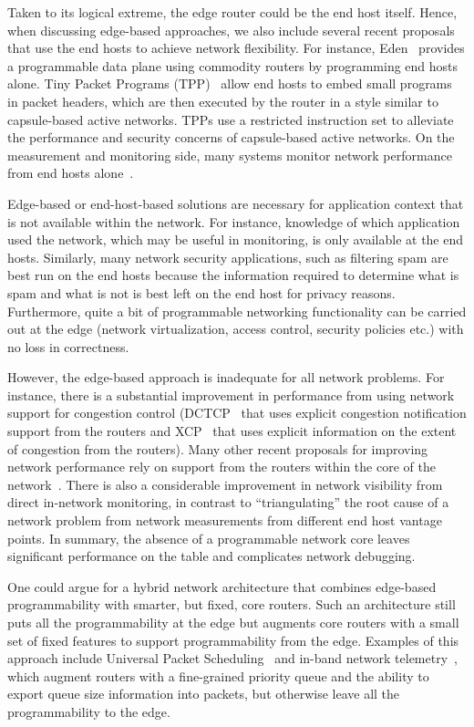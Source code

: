 Taken to its logical extreme, the edge router could be the end host itself.
Hence, when discussing edge-based approaches, we also include several recent
proposals that use the end hosts to achieve network flexibility. For instance,
Eden~\cite{eden} provides a programmable data plane using commodity routers by
programming end hosts alone.  Tiny Packet Programs (TPP)~\cite{tpp} allow end
hosts to embed small programs in packet headers, which are then executed by the
router in a style similar to capsule-based active networks. TPPs use a
restricted instruction set to alleviate the performance and security concerns
of capsule-based active networks. On the measurement and monitoring side, many
systems monitor network performance from end hosts alone~\cite{netpoirot,
minlan-snap, dapper-sosr, trumpet, azure-smartnic}.

Edge-based or end-host-based solutions are necessary for application context
that is not available within the network. For instance, knowledge of which
application used the network, which may be useful in monitoring, is only
available at the end hosts.  Similarly, many network security applications,
such as filtering spam are best run on the end hosts because the information
required to determine what is spam and what is not is best left on the end host
for privacy reasons. Furthermore, quite a bit of programmable networking
functionality can be carried out at the edge (\eg network virtualization,
access control, security policies etc.) with no loss in correctness.

However, the edge-based approach is inadequate for all network problems. For
instance, there is a substantial improvement in performance from using network
support for congestion control (\eg DCTCP~\cite{dctcp} that uses explicit
congestion notification support from the routers and XCP~\cite{xcp} that uses
explicit information on the extent of congestion from the routers). Many other
recent proposals for improving network performance rely on support from the
routers within the core of the network~\cite{pFabric, pias, d3, rcp, detail,
conga, letflow}. There is also a considerable improvement in network visibility
from direct in-network monitoring, in contrast to ``triangulating'' the root cause of a
network problem from network measurements from different end host vantage
points.  In summary, the absence of a programmable network core leaves
significant performance on the table and complicates network debugging.

One could argue for a hybrid network architecture that combines edge-based
programmability with smarter, but fixed, core routers. Such an architecture
still puts all the programmability at the edge but augments core routers with a
small set of fixed features to support programmability from the edge.  Examples
of this approach include Universal Packet Scheduling~\cite{ups} and in-band
network telemetry~\cite{int, int_paper}, which augment routers with a
fine-grained priority queue and the ability to export queue size information
into packets, but otherwise leave all the programmability to the edge.

